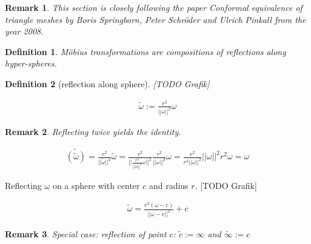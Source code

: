 \documentclass[]{article}
\newtheorem{definition}{Definition}
\newtheorem{remark}{Remark}
\begin{document}
\begin{remark}
	This section is closely following the paper Conformal equivalence of triangle meshes by Boris Springborn, Peter Schröder and Ulrich Pinkall from the year 2008.
\end{remark}


\begin{definition}
	Möbius transformations are compositions of reflections along hyper-spheres.
\end{definition}

\begin{definition}[reflection along sphere]
	[TODO Grafik]
	
	\begin{align*}
		\tilde{\omega} := \frac{r^2}{||\omega||^2}\omega
	\end{align*}
\end{definition}

\begin{remark}
	Reflecting twice yields the identity.
	
	\begin{align*}
		\tilde{(\tilde{\omega})} = \frac{r^2}{||\tilde{\omega}||^2}\tilde{\omega} = \frac{r^2}{||\frac{r^2}{||\omega||^2}\omega||^2}\frac{r^2}{||\omega||^2}\omega = \frac{r^2}{r^4||\omega||^2}||\omega||^2 r^2 \omega = \omega
	\end{align*}
\end{remark}

Reflecting $\omega$ on a sphere with center $c$ and radius $r$.
[TODO Grafik]

\begin{align*}
	\tilde{\omega} = \frac{r^2(\omega - c)}{||\omega - c||^2} + c
\end{align*}

\begin{remark}
	Special case: reflection of point $c$: $\tilde{c} := \infty$ and $\tilde{\infty} := c$
\end{remark}
\end{document}
